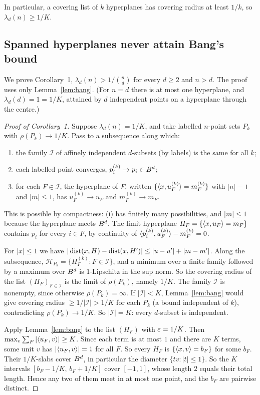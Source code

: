 \documentclass[11pt]{article}
\newcommand{\AI}{\mathcal{I}}
\begin{document}
In particular, a covering list of $k$ hyperplanes has covering radius at least $1/k$, so
$\lambda_d(n) \ge 1/K$.

\subsection{Spanned hyperplanes never attain Bang's bound}
\label{sec:A-strict}

We prove Corollary~1, $\lambda_d(n) > 1/\binom nd$ for every $d \ge 2$ and $n > d$. The proof uses only
Lemma~\ref{lem:bang}. (For $n = d$ there is at most one hyperplane, and $\lambda_d(d) = 1 = 1/K$, attained
by $d$ independent points on a hyperplane through the centre.)

\begin{proof}[Proof of Corollary~1]
Suppose $\lambda_d(n) = 1/K$, and take labelled $n$-point sets $P_k$ with $\rho(P_k) \to 1/K$.
Pass to a subsequence along which:
\begin{enumerate}[label=(\roman*)]
  \item the family $\AI$ of affinely independent $d$-subsets (by labels) is the same for all $k$;
  \item each labelled point converges, $p_i^{(k)} \to p_i \in B^d$;
  \item for each $F \in \AI$, the hyperplane of $F$, written
    $\{\langle x,u_F^{(k)}\rangle = m_F^{(k)}\}$ with $|u| = 1$ and $|m| \le 1$, has $u_F^{(k)} \to u_F$
    and $m_F^{(k)} \to m_F$.
\end{enumerate}
This is possible by compactness: (i) has finitely many possibilities, and $|m| \le 1$ because the
hyperplane meets $B^d$. The limit hyperplane $H_F = \{\langle x,u_F\rangle = m_F\}$ contains $p_i$ for
every $i \in F$, by continuity of $\langle p_i^{(k)},u_F^{(k)}\rangle - m_F^{(k)} = 0$.

For $|x| \le 1$ we have $|\operatorname{dist}(x, H) - \operatorname{dist}(x, H')| \le |u - u'| + |m - m'|$. Along the
subsequence, $\mathcal H_{P_k} = \{H_F^{(k)} : F \in \AI\}$, and a minimum over a finite family followed by a
maximum over $B^d$ is $1$-Lipschitz in the sup norm. So the covering radius of the list
$(H_F)_{F \in \AI}$ is the limit of $\rho(P_k)$, namely $1/K$. The family $\AI$ is nonempty, since
otherwise $\rho(P_k) = \infty$. If $|\AI| < K$, Lemma~\ref{lem:bang} would give covering radius
$\ge 1/|\AI| > 1/K$ for each $P_k$ (a bound independent of $k$), contradicting
$\rho(P_k) \to 1/K$. So $|\AI| = K$: every $d$-subset is independent.

Apply Lemma~\ref{lem:bang} to the list $(H_F)$ with $\varepsilon = 1/K$. Then
$\max_v \sum_F |\langle u_F,v\rangle| \ge K$. Since each term is at most $1$ and there are $K$ terms, some
unit $v$ has $|\langle u_F,v\rangle| = 1$ for all $F$. So every $H_F$ is $\{\langle x,v\rangle = b_F\}$ for some
$b_F$. Their $1/K$-slabs cover $B^d$, in particular the diameter $\{tv : |t| \le 1\}$. So the
$K$ intervals $[b_F - 1/K,\, b_F + 1/K]$ cover $[-1, 1]$, whose length $2$ equals their total
length. Hence any two of them meet in at most one point, and the $b_F$ are pairwise distinct.


\end{proof}
\end{document}
